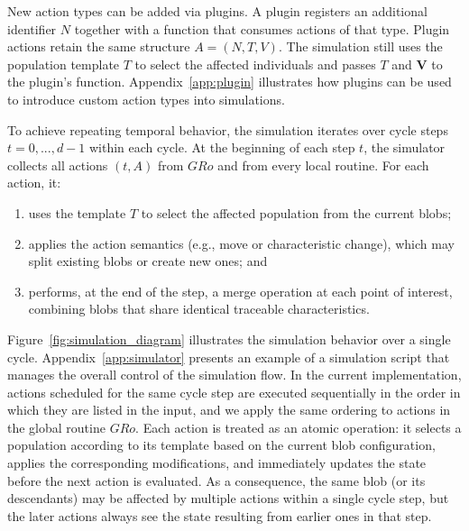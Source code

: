 \documentclass[pdflatex,sn-mathphys-num]{sn-jnl}%
\newcommand\redb[1]{#1}
\theoremstyle{thmstyleone}%
\theoremstyle{thmstyletwo}%
\theoremstyle{thmstylethree}%
\begin{document}
New action types can be added via plugins. A plugin registers an additional identifier $N$ together with a function that consumes actions of that type. Plugin actions retain the same structure $A=(N,T,V)$. The simulation still uses the population template $T$ to select the affected individuals and passes $T$ and $\bm{V}$ to the plugin’s function. Appendix~\ref{app:plugin} illustrates how plugins can be used to introduce custom action types into simulations.


To achieve repeating temporal behavior, the simulation iterates over cycle steps $t = 0, ..., d-1$ within each cycle. At the beginning of each step 
$t$, the simulator collects all actions $(t,A)$ from $GRo$ and from every local routine. For each action, it:
\begin{enumerate}
    \item uses the template $T$ to select the affected population from the current blobs;
    \item applies the action semantics (e.g., move or characteristic change), which may split existing blobs or create new ones; and
    \item performs, at the end of the step, a merge operation at each point of interest, combining blobs that share identical traceable characteristics.
\end{enumerate}

Figure~\ref{fig:simulation_diagram} illustrates the simulation behavior over a single cycle. Appendix~\ref{app:simulator} presents an example of a simulation script that manages the overall control of the simulation flow. \redb{In the current implementation, actions scheduled for the same cycle step are executed sequentially in the order in which they are listed in the input, and we apply the same ordering to actions in the global routine $GRo$. 
Each action is treated as an atomic operation: it selects a population according to its template based on the current blob configuration, applies the corresponding modifications, and immediately updates the state before the next action is evaluated. As a consequence, the same blob (or its descendants) may be affected by multiple actions within a single cycle step, but the later actions always see the state resulting from earlier ones in that step.}
\end{document}
